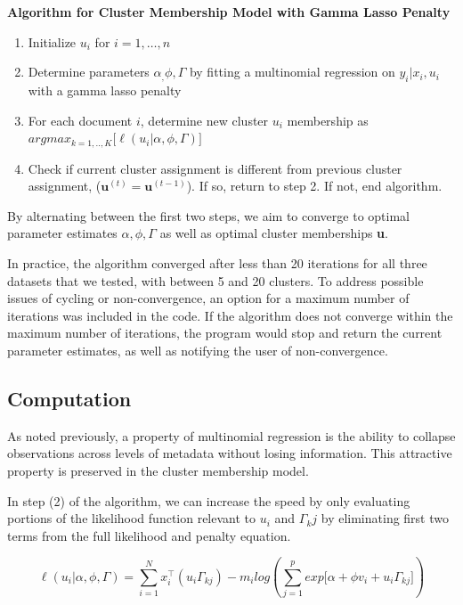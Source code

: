 \documentclass[12pt]{article}
\begin{document}
\textbf{Algorithm for Cluster Membership Model with Gamma Lasso Penalty}
\begin{enumerate}
\def\labelenumi{\arabic{enumi}.}
\item
 Initialize $u_i$ for $i = 1, \dots, n$
\item
  Determine parameters $\alpha_, \phi, \Gamma$ by fitting a multinomial
  regression on $y_i | x_i , u_i$ with a gamma lasso penalty
\item
  For each document $i$, determine new cluster $u_i$ membership as \\
  $argmax_{k = 1,..,K} \big[  \ell(u_i| \alpha, \phi, \Gamma) \big]$
\item 
Check if current cluster assignment is different from previous cluster assignment, ($\textbf{u}^{(t)}  = \textbf{u}^{(t-1)}$). If so, return to step 2. If not, end algorithm.
\end{enumerate}


By alternating between the first two steps, we aim to converge to optimal
parameter estimates $\alpha, \phi, \Gamma$ as well as optimal cluster
memberships \textbf{u}.

In practice, the algorithm converged after less than 20 iterations for all three datasets that we tested, with between 5 and 20 clusters. To address possible issues of cycling or non-convergence, an option for a maximum number of iterations was included in the code. 
If the algorithm does not converge within the maximum number of iterations, the program would stop and return the current parameter estimates, as well as  notifying the user of non-convergence.

\subsection{Computation}\label{computation}
As noted previously, a property of multinomial regression is the ability to
collapse observations across levels of metadata without losing information. This attractive
property is preserved in the cluster membership model.

In step (2) of the algorithm, we can increase the speed by only evaluating portions of the likelihood function relevant to $u_i$ and $\Gamma_kj$ by eliminating first two terms from the full likelihood and penalty equation.

\begin{equation} 
\ell(u_i|\alpha,\phi,\Gamma) = \sum_{i = 1}^{N}{ x_i^\top (u_i \Gamma_{kj})} - m_i log(\sum_{j = 1}^{p}{exp{\big[ \alpha + \phi v_i + u_i \Gamma_{kj} \big]}})
\end{equation}
\end{document}
